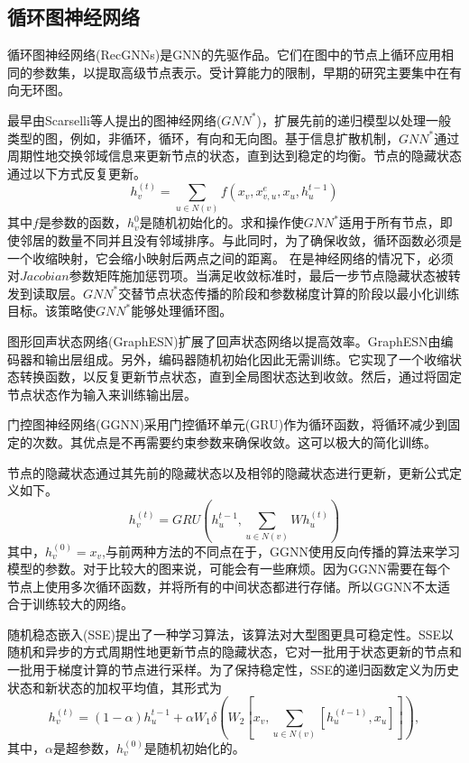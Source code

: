 \subsection{循环图神经网络}
循环图神经网络(RecGNNs)是GNN的先驱作品。它们在图中的节点上循环应用相同的参数集，以提取高级节点表示。受计算能力的限制，早期的研究主要集中在有向无环图。

最早由Scarselli等人提出的图神经网络($GNN^*$)\cite{scarselli2008graph}，扩展先前的递归模型以处理一般类型的图，例如，非循环，循环，有向和无向图。基于信息扩散机制，$GNN^*$通过周期性地交换邻域信息来更新节点的状态，直到达到稳定的均衡。节点的隐藏状态通过以下方式反复更新。
\[
h_v^{(t)}=\sum_{u\in N(v)}f(x_v,x^e_{v,u},x_u,h_u^{t-1})
\]
其中$f$是参数的函数，$h_v^{0}$是随机初始化的。求和操作使$GNN^*$适用于所有节点，即使邻居的数量不同并且没有邻域排序。与此同时，为了确保收敛，循环函数必须是一个收缩映射，它会缩小映射后两点之间的距离。
在是神经网络的情况下，必须对$Jacobian$参数矩阵施加惩罚项。当满足收敛标准时，最后一步节点隐藏状态被转发到读取层。$GNN^*$交替节点状态传播的阶段和参数梯度计算的阶段以最小化训练目标。该策略使$GNN^*$能够处理循环图。

图形回声状态网络(GraphESN)扩展了回声状态网络以提高效率。GraphESN由编码器和输出层组成。另外，编码器随机初始化因此无需训练。它实现了一个收缩状态转换函数，以反复更新节点状态，直到全局图状态达到收敛。然后，通过将固定节点状态作为输入来训练输出层。

门控图神经网络(GGNN)采用门控循环单元(GRU)作为循环函数，将循环减少到固定的次数。其优点是不再需要约束参数来确保收敛。这可以极大的简化训练。

节点的隐藏状态通过其先前的隐藏状态以及相邻的隐藏状态进行更新，更新公式定义如下。
\[
h_v^{(t)}=GRU(h_u^{t-1},\sum_{u\in N(v)} Wh_u^{(t)})
\]
其中，$h_v^{(0)}=x_v$,与前两种方法的不同点在于，GGNN使用反向传播的算法来学习模型的参数。对于比较大的图来说，可能会有一些麻烦。因为GGNN需要在每个节点上使用多次循环函数，并将所有的中间状态都进行存储。所以GGNN不太适合于训练较大的网络。

随机稳态嵌入(SSE)提出了一种学习算法，该算法对大型图更具可稳定性。SSE以随机和异步的方式周期性地更新节点的隐藏状态，它对一批用于状态更新的节点和一批用于梯度计算的节点进行采样。为了保持稳定性，SSE的递归函数定义为历史状态和新状态的加权平均值，其形式为
\[
h_v^{(t)}=(1-\alpha)h_u^{t-1}+\alpha W_1\delta(W_2[x_v,\sum_{u\in N(v)}[h_u^{(t-1)},x_u]]) ,
\]
其中，$\alpha$是超参数，$h_v^{(0)}$是随机初始化的。


